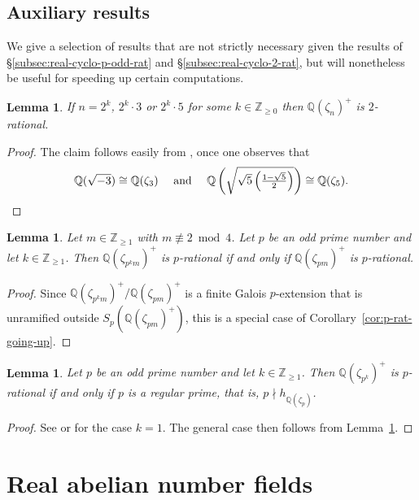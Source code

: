 \documentclass[12pt, a4paper, usenames]{amsart}
\newcommand{\Z}{\mathbb{Z}}
\newcommand{\Q}{\mathbb{Q}}
\theoremstyle{plain}
\newtheorem{lemma}[theorem]{Lemma}
\theoremstyle{remark}
\theoremstyle{definition}
\begin{document}
\subsection{Auxiliary results}\label{subsec:real-cyclo-aux}
We give a selection of results that are not strictly necessary given the results 
of \S \ref{subsec:real-cyclo-p-odd-rat} and \S \ref{subsec:real-cyclo-2-rat}, but 
will nonetheless be useful for speeding up certain computations.

\begin{lemma}
If $n=2^{k}$, $2^{k} \cdot 3$ or $2^{k} \cdot 5$
for some $k \in \Z_{\geq 0}$ then $\Q(\zeta_{n})^{+}$ is $2$-rational.    
\end{lemma}

\begin{proof}
The claim follows easily from \cite[IV, 3.5.1]{MR1941965}, once one observes that 
\[
\Q(\sqrt{-3}) \cong \Q(\zeta_{3}) \quad \text{ and } \quad
\textstyle{\Q\left(\sqrt{\sqrt{5}  \left(\frac{1-\sqrt{5}}{2}\right) }\right)} \cong \Q(\zeta_{5}). \qedhere
\]    
\end{proof}

\begin{lemma}\label{lem:cyclo-going-up}
Let $m \in \Z_{\geq 1}$ with $m \not \equiv 2 \bmod{4}$.
Let $p$ be an odd prime number and let $k \in \Z_{\geq 1}$.
Then $\Q(\zeta_{p^{k}m})^{+}$ is $p$-rational if and only if $\Q(\zeta_{pm})^{+}$ is $p$-rational.     
\end{lemma}

\begin{proof}
Since $\Q(\zeta_{p^{k}m})^{+}/\Q(\zeta_{pm})^{+}$ is a finite Galois $p$-extension that
is unramified outside $S_{p}(\Q(\zeta_{pm})^{+})$, this is a special case of
Corollary~\ref{cor:p-rat-going-up}.
\end{proof}

\begin{lemma}\label{lem:p-regular}
Let $p$ be an odd prime number and let $k \in \Z_{\geq 1}$.
Then $\Q(\zeta_{p^{k}})^{+}$ is $p$-rational if and only if $p$ is a regular prime,
that is, $p \nmid h_{\Q(\zeta_{p})}$.
\end{lemma}

\begin{proof}
See \cite[Example (ii)(a), p.\ 503]{MR1324685} or 
\cite[discussion after Corollary~2.2]{MR4192837} for the case $k=1$.
The general case then follows from Lemma~\ref{lem:cyclo-going-up}.
\end{proof}


\section{Real abelian number fields}\label{sec:real-abelian-number-fields}
\end{document}
